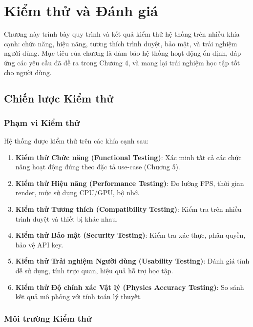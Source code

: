 
\chapter{Kiểm thử và Đánh giá}

Chương này trình bày quy trình và kết quả kiểm thử hệ thống trên nhiều khía cạnh: chức năng, hiệu năng, tương thích trình duyệt, bảo mật, và trải nghiệm người dùng. Mục tiêu của chương là đảm bảo hệ thống hoạt động ổn định, đáp ứng các yêu cầu đã đề ra trong Chương 4, và mang lại trải nghiệm học tập tốt cho người dùng.

\section{Chiến lược Kiểm thử}

\subsection{Phạm vi Kiểm thử}

Hệ thống được kiểm thử trên các khía cạnh sau:

\begin{enumerate}
    \item \textbf{Kiểm thử Chức năng (Functional Testing)}: Xác minh tất cả các chức năng hoạt động đúng theo đặc tả use-case (Chương 5).
    \item \textbf{Kiểm thử Hiệu năng (Performance Testing)}: Đo lường FPS, thời gian render, mức sử dụng CPU/GPU, bộ nhớ.
    \item \textbf{Kiểm thử Tương thích (Compatibility Testing)}: Kiểm tra trên nhiều trình duyệt và thiết bị khác nhau.
    \item \textbf{Kiểm thử Bảo mật (Security Testing)}: Kiểm tra xác thực, phân quyền, bảo vệ API key.
    \item \textbf{Kiểm thử Trải nghiệm Người dùng (Usability Testing)}: Đánh giá tính dễ sử dụng, tính trực quan, hiệu quả hỗ trợ học tập.
    \item \textbf{Kiểm thử Độ chính xác Vật lý (Physics Accuracy Testing)}: So sánh kết quả mô phỏng với tính toán lý thuyết.
\end{enumerate}

\subsection{Môi trường Kiểm thử}

